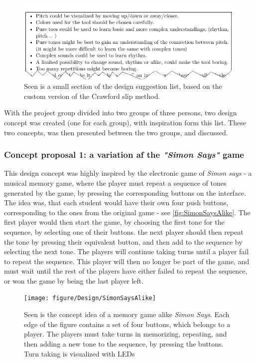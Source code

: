 \begin{figure}[H]
	\centering
	\includegraphics[width=0.7\linewidth]{figure/Design/snippetOfList} 
	\caption{Seen is a small section of the design suggestion list, based on the custom version of the Crawford slip method.}
	\label{fig:snippetOfList}
\end{figure}


With the project group divided into two groups of three persons, two design concept was created (one for each group), with inspiration form this list. These two concepts, was then presented between the two groups, and discussed.  

\subsubsection{Concept proposal 1: a variation af the \textit{"Simon Says"} game }
This design concept was highly inspired by the electronic game of \textit{Simon says} \cite{simonSays} - a musical memory game, where the player must repeat a sequence of tones generated by the game, by pressing the corresponding buttons on the interface. The idea was, that each student would have their own four push buttons, corresponding to the ones from the original game - see \autoref{fig:SimonSaysAlike}. The first player would then start the game, by choosing the first tone for the sequence, by selecting one of their buttons. the next player should then repeat the tone by pressing their equivalent button, and then add to the sequence by selecting the next tone. The players will continue taking turns until a player fail to repeat the sequence. This player will then no longer be part of the game, and must wait until the rest of the players have either failed to repeat the sequence, or won the game by being the last player left.     

\begin{figure}[H]
	\centering
	\texttt{[image: figure/Design/SimonSaysAlike]} 
	\caption{Seen is the concept idea of a memory game alike \textit{Simon Says}. Each edge of the figure contains a set of four buttons, which belongs to a player. The players must take turns in memorizing, repeating, and then adding a new tone to the sequence, by pressing the buttons. Turn taking is visualized with LEDs}
	\label{fig:SimonSaysAlike}
\end{figure}

